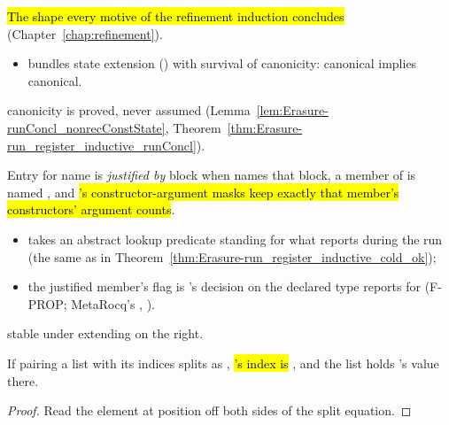 \begin{definition}
\label{def:Erasure-RunConcl}
\leanok
{}
 \hl{The shape every motive of the refinement induction concludes}
(Chapter~\ref{chap:refinement}).
\begin{itemize}
\item {} bundles state extension () with survival of canonicity:
 canonical implies  canonical.
\end{itemize}
 canonicity is proved, never assumed
(Lemma~\ref{lem:Erasure-runConcl_nonrecConstState}, Theorem~\ref{thm:Erasure-run_register_inductive_runConcl}).
\end{definition}

\begin{definition}
\label{def:Erasure-RegisteredBodyAt}
\leanok
{}
 Entry  for name  is \emph{justified by} block  when
 names that block, a member of  is named , and \hl{'s
constructor-argument masks keep exactly that member's constructors' argument counts}.
\begin{itemize}
\item takes an abstract lookup predicate  standing for what  reports
during the run (the same  as in Theorem~\ref{thm:Erasure-run_register_inductive_cold_ok});
\item the justified member's  flag is 's
decision on the declared type  reports for  (F-PROP; MetaRocq's
, ).
\end{itemize}
 stable under extending  on the right.
\end{definition}

\begin{lemma}
\label{lem:Erasure-zipIdx_split_snd}
\leanok
{} If pairing a list with its indices splits as , \hl{'s
index is }, and the list holds 's value there.
\end{lemma}
\begin{proof}
\leanok
{} Read the element at position  off both sides of the split equation.
\end{proof}

